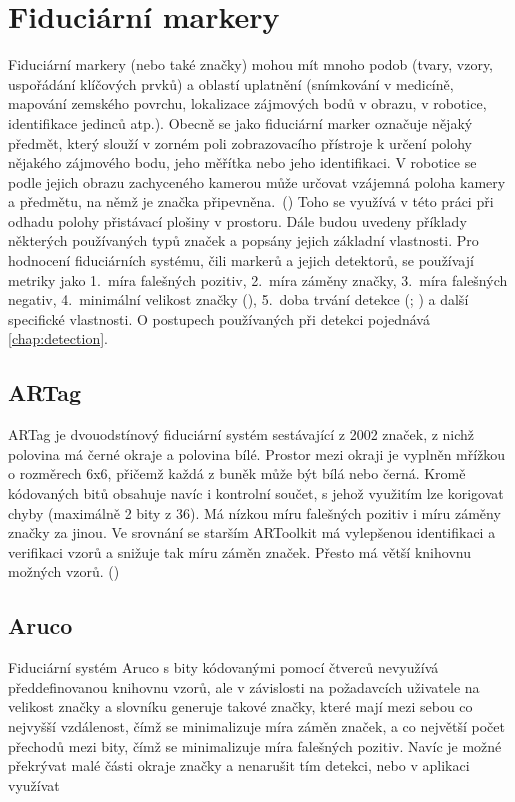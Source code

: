   \section{Fiduciární markery} \label{sec:fidu} %
    Fiduciární markery (nebo také značky) mohou mít mnoho podob (tvary, vzory, uspořádání klíčových prvků) a oblastí uplatnění (snímkování v medicíně, mapování zemského povrchu, lokalizace zájmových bodů v obrazu, v robotice, identifikace jedinců atp.). Obecně se jako fiduciární marker označuje nějaký předmět, který slouží v zorném poli zobrazovacího přístroje k určení polohy nějakého zájmového bodu, jeho měřítka nebo jeho identifikaci. V robotice se podle jejich obrazu zachyceného kamerou může určovat vzájemná poloha kamery a předmětu, na němž je značka připevněna.~(\cite{kostak:fidmark}) Toho se využívá v této práci při odhadu polohy přistávací plošiny v prostoru. Dále budou uvedeny příklady některých používaných typů značek a popsány jejich základní vlastnosti. Pro hodnocení fiduciárních systému, čili markerů a jejich detektorů, se používají metriky jako 1.~míra falešných pozitiv, 2.~míra záměny značky, 3.~míra falešných negativ, 4.~minimální velikost značky (\cite{artag}), 5.~doba trvání detekce (\cite{aruco}; \cite{apriltag2}) a další specifické vlastnosti. O postupech používaných při detekci pojednává \cref{chap:detection}.
    \subsection{ARTag}
      ARTag je dvouodstínový fiduciární systém sestávající z 2002 značek, z nichž polovina má černé okraje a polovina bílé. Prostor mezi okraji je vyplněn mřížkou o rozměrech 6x6, přičemž každá z buněk může být bílá nebo černá. Kromě kódovaných bitů obsahuje navíc i kontrolní součet, s jehož využitím lze korigovat chyby (maximálně 2 bity z 36). Má nízkou míru falešných pozitiv i míru záměny značky za jinou. Ve srovnání se starším ARToolkit má vylepšenou identifikaci a verifikaci vzorů a snižuje tak míru záměn značek. Přesto má větší knihovnu možných vzorů. (\cite{artag})
    \subsection{Aruco}
      Fiduciární systém Aruco s bity kódovanými pomocí čtverců nevyužívá předdefinovanou knihovnu vzorů, ale v závislosti na požadavcích uživatele na velikost značky a slovníku generuje takové značky, které mají mezi sebou co nejvyšší vzdálenost, čímž se minimalizuje míra záměn značek, a co největší počet přechodů mezi bity, čímž se minimalizuje míra falešných pozitiv. Navíc je možné překrývat malé části okraje značky a nenarušit tím detekci, nebo v aplikaci využívat
